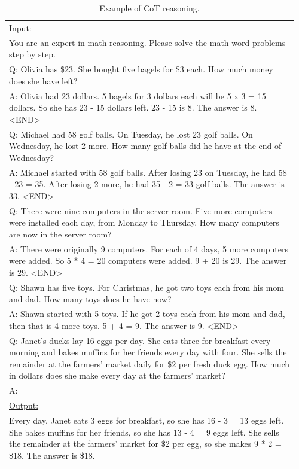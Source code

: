 \documentclass[10pt]{article} %
\begin{document}
      \begin{table}[t]
        \caption{Example of CoT reasoning.}
        \label{tab:cot-reasoning}
        \begin{center}
        \begin{tabular}{|p{0.96\linewidth}|}
        \hline
        \underline{Input:}\\
        You are an expert in math reasoning. Please solve the math word problems step by step.\\
        Q: Olivia has \$23. She bought five bagels for \$3 each. How much money does she have left?\\
        A: Olivia had 23 dollars. 5 bagels for 3 dollars each will be 5 x 3 = 15 dollars. So she has 23 - 15 dollars left. 23 - 15 is 8. The answer is 8. \textless END\textgreater\\
        Q: Michael had 58 golf balls. On Tuesday, he lost 23 golf balls. On Wednesday, he lost 2 more. How many golf balls did he have at the end of Wednesday?\\
        A: Michael started with 58 golf balls. After losing 23 on Tuesday, he had 58 - 23 = 35. After losing 2 more, he had 35 - 2 = 33 golf balls. The answer is 33. \textless END\textgreater\\
        Q: There were nine computers in the server room. Five more computers were installed each day, from Monday to Thursday. How many computers are now in the server room?\\
        A: There were originally 9 computers. For each of 4 days, 5 more computers were added. So 5 * 4 = 20 computers were added. 9 + 20 is 29. The answer is 29. \textless END\textgreater\\
        Q: Shawn has five toys. For Christmas, he got two toys each from his mom and dad. How many toys does he have now?\\
        A: Shawn started with 5 toys. If he got 2 toys each from his mom and dad, then that is 4 more toys. 5 + 4 = 9. The answer is 9. \textless END\textgreater\\
        Q: Janet’s ducks lay 16 eggs per day. She eats three for breakfast every morning and bakes muffins for her friends every day with four. She sells the remainder at the farmers' market daily for \$2 per fresh duck egg. How much in dollars does she make every day at the farmers' market?\\
        A: \\
        \hline
        \underline{Output:} \\
        Every day, Janet eats 3 eggs for breakfast, so she has 16 - 3 = 13 eggs left.
        She bakes muffins for her friends, so she has 13 - 4 = 9 eggs left.
        She sells the remainder at the farmers' market for \$2 per egg, so she makes 9 * 2 = \$18.
        The answer is \$18.\\
        \hline
        \end{tabular}
        \end{center}
        \end{table}
\end{document}
